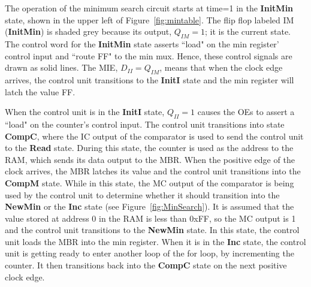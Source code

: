 The operation of the minimum search circuit starts at time=1
in the {\bf InitMin} state, shown in the upper left of 
Figure~\ref{fig:mintable}.  The flip flop labeled IM ({\bf InitMin}) 
is shaded grey because its output, $Q_{IM}=1$; it is the current state.  
The control word for the {\bf InitMin} state asserts ``load" on the 
min register' control input and ``route FF" to the min mux. Hence, 
these control signals are drawn as solid lines.
The MIE, $D_{II} = Q_{IM}$, means that when the clock edge 
arrives, the control unit transitions to the {\bf InitI} 
state and the min register will latch the value FF.

When the control unit is in the {\bf InitI} state, $Q_{II}=1$
causes the OEs to assert a ``load" on the counter's control
input.  The control unit transitions into state {\bf CompC},
where the IC output of the comparator is used
to send the control unit to the {\bf Read} state.
During this state, the counter is used as the address to
the RAM, which sends its data output to the MBR.  When the 
positive edge of the clock arrives, the MBR latches its
value and the control unit transitions into the {\bf CompM} 
state.  While in this state, the MC output of the comparator
is being used by the control unit to determine whether it 
should transition into the {\bf NewMin} or the {\bf Inc} state
(see Figure~\ref{fig:MinSearch}).  It is assumed that the 
value stored at address 0 in the RAM is less than 0xFF, so
the MC output is 1 and the control unit transitions to the 
{\bf NewMin} state.  In this state, the control 
unit loads the MBR into the min register.  When it is in the {\bf Inc}
state, the control unit is getting ready to enter another loop of the
for loop, by incrementing the counter.  It then transitions
back into the {\bf CompC} state on the next positive clock edge.


